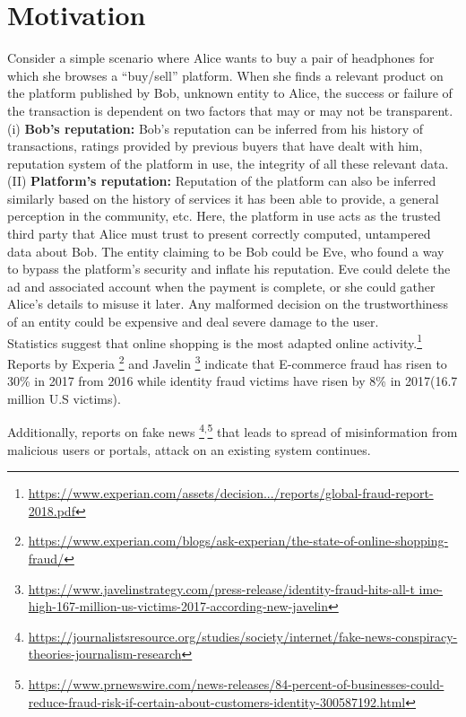 \section{Motivation}
Consider a simple scenario where Alice wants to buy a pair of headphones for
which she browses a ``buy/sell'' platform. When she finds a relevant product on the
platform published by Bob, unknown entity to Alice, the success or failure of
the transaction is dependent on two factors that may or may not be transparent.\\
(i) \textbf{Bob's reputation:} Bob's reputation can be inferred from his
history of transactions, ratings provided by previous buyers that have dealt
with him, reputation system of the platform in use, the integrity of all these
relevant data. \\
(II) \textbf{Platform's reputation:} Reputation of the platform can also be
inferred similarly based on the history of services it has been able to
provide, a general perception in the community, etc.  Here, the platform in use
acts as the trusted third party that Alice must trust to present correctly
computed, untampered data about Bob. The entity claiming to be Bob could be Eve,
who found a way to bypass the platform's security and inflate his reputation.
Eve could delete the ad and associated account when the payment is complete, or
she could gather Alice's details to misuse it later.  Any malformed decision on
the trustworthiness of an entity could be expensive and deal severe damage to
the user.\\ 
Statistics suggest that online shopping is the most adapted online
activity.\footnote{\url{https://www.experian.com/assets/decision.../reports/global-fraud-report-2018.pdf}}
Reports by Experia
\footnote{\url{https://www.experian.com/blogs/ask-experian/the-state-of-online-shopping-fraud/}}
and Javelin
\footnote{\url{https://www.javelinstrategy.com/press-release/identity-fraud-hits-all-t
ime-high-167-million-us-victims-2017-according-new-javelin}} indicate that
E-commerce fraud has risen to 30\% in 2017 from 2016 while identity fraud
victims have risen by 8\% in 2017(16.7 million U.S victims). 

Additionally, reports on fake news
\footnote{\url{https://journalistsresource.org/studies/society/internet/fake-news-conspiracy-theories-journalism-research}}$^{,}$\footnote{\url{https://www.prnewswire.com/news-releases/84-percent-of-businesses-could-reduce-fraud-risk-if-certain-about-customers-identity-300587192.html}}
that leads to spread of misinformation from malicious users or portals, attack
on an existing system continues.

